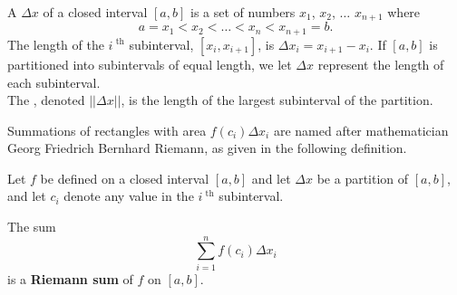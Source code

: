 {A  $\Delta x$ of a closed interval $[a,b]$ is a set of numbers $x_1$, $x_2$, $\ldots$ $x_{n+1}$ where 
$$a=x_1 < x_2 < \ldots < x_n < x_{n+1}=b.$$
The length of the $i^\text{ th}$ subinterval, $[x_i,x_{i+1}]$, is $\Delta x_i = x_{i+1}-x_i$. If $[a,b]$ is partitioned into subintervals of equal length, we let $\Delta x$ represent the length of each subinterval.\\

The , denoted $||\Delta x||$, is the length of the largest subinterval of the partition.

%
}

Summations of rectangles with area $f(c_i)\Delta x_i$ are named after mathematician Georg Friedrich Bernhard Riemann, as given in the following definition.



{%
%
%
Let $f$ be defined on a closed interval $[a,b]$ and let $\Delta x$ be a partition of $[a,b]$, 
and let $c_i$ denote any value in the $i^\text{ th}$ subinterval.

The sum $$\sum_{i=1}^n f(c_i)\Delta x_i$$  is a \textbf{Riemann sum} of $f$ on $[a,b]$.}

